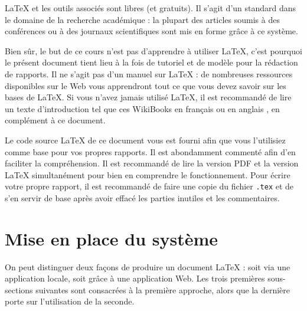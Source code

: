 \documentclass{ceri}
\begin{document}
\LaTeX{} et les outils associés sont libres (et gratuits). Il s'agit d'un standard dans le domaine de la recherche académique : la plupart des articles soumis à des conférences ou à des journaux scientifiques sont mis en forme gr\^ace à ce système.
	
Bien s\^ur, le but de ce cours n'est pas d'apprendre à utiliser \LaTeX{}, c'est pourquoi le présent document tient lieu à la fois de tutoriel et de modèle pour la rédaction de rapports. Il ne s'agit pas d'un manuel sur \LaTeX{} : de nombreuses ressources disponibles sur le Web vous apprendront tout ce que vous devez savoir sur les bases de \LaTeX{}. Si vous n'avez jamais utilisé \LaTeX{}, il est recommandé de lire un texte d'introduction tel que ces WikiBooks en français \cite{Wikibooks2010} ou en anglais \cite{Wikibooks2011}, en complément à ce document.
	
Le code source \LaTeX{} de ce document vous est fourni afin que vous l'utilisiez comme base pour vos propres rapports. Il est abondamment commenté afin d'en faciliter la compréhension. Il est recommandé de lire la version PDF et la version \LaTeX{} simultanément pour bien en comprendre le fonctionnement. Pour écrire votre propre rapport, il est recommandé de faire une copie du fichier \texttt{.tex} et de s'en servir de base après avoir effacé les parties inutiles et les commentaires.
	  


\section{Mise en place du système}
On peut distinguer deux façons de produire un document \LaTeX{} : soit via une application locale, soit grâce à une application Web. Les trois premières sous-sections suivantes sont consacrées à la première approche, alors que la dernière porte sur l'utilisation de la seconde.
\end{document}
